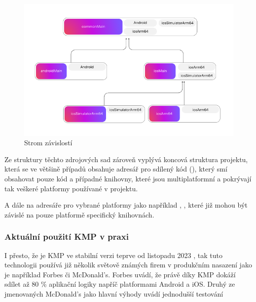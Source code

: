 
\begin{figure}[H]
  \centering
  \includegraphics[width=.9\textwidth]{dependson-tree-diagram.png}
  \caption{Strom závislostí}
  \label{fig:dependson-tree-diagram}
\end{figure}

Ze struktury těchto zdrojových sad zároveň vyplývá koncová struktura projektu, která se ve většině případů obsahuje adresář pro sdílený kód (), 
který smí obsahovat pouze kód a případné knihovny, které jsou multiplatformní a pokrývají tak veškeré platformy používané v projektu.

A dále na adresáře pro vybrané platformy jako například , , které již mohou být závislé na pouze platformě specifický knihovnách.

\subsubsection*{Aktuální použití KMP v praxi} \label{kmpInPractise}

I přesto, že je KMP ve stabilní verzi teprve od listopadu 2023 \cite{KMPstable}, tak tuto technologii používá již několik světově 
známých firem v produkčním nasazení jako je například Forbes či McDonald's. Forbes uvádí, že právě díky KMP dokáží sdílet až 80 \%
aplikační logiky napříč platformami Android a iOS. \cite{KMPinForbes} 
Druhý ze jmenovaných McDonald's jako hlavní výhody uvádí jednodušší testování \cite{KMPinMcDonalds}

